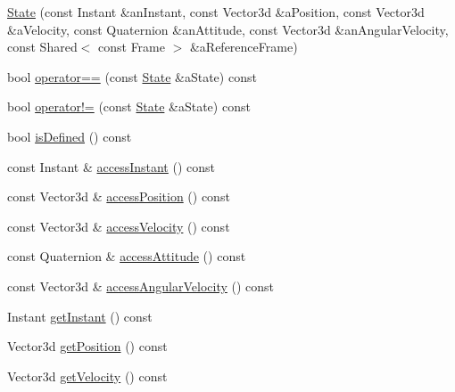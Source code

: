 \begin{DoxyCompactItemize}
\item 
\hyperlink{classlibrary_1_1astro_1_1flight_1_1profile_1_1_state_a254a001f4c2ddc33684dbfdd4ee07194}{State} (const Instant \&an\+Instant, const Vector3d \&a\+Position, const Vector3d \&a\+Velocity, const Quaternion \&an\+Attitude, const Vector3d \&an\+Angular\+Velocity, const Shared$<$ const Frame $>$ \&a\+Reference\+Frame)
\item 
bool \hyperlink{classlibrary_1_1astro_1_1flight_1_1profile_1_1_state_af9508e4482013592c37e57173baea944}{operator==} (const \hyperlink{classlibrary_1_1astro_1_1flight_1_1profile_1_1_state}{State} \&a\+State) const
\item 
bool \hyperlink{classlibrary_1_1astro_1_1flight_1_1profile_1_1_state_a086731f12479cad3f2e505572fa67883}{operator!=} (const \hyperlink{classlibrary_1_1astro_1_1flight_1_1profile_1_1_state}{State} \&a\+State) const
\item 
bool \hyperlink{classlibrary_1_1astro_1_1flight_1_1profile_1_1_state_a1fceb93d0163b18666319c16aef6dd23}{is\+Defined} () const
\item 
const Instant \& \hyperlink{classlibrary_1_1astro_1_1flight_1_1profile_1_1_state_abc3c190e5bdceda1d7c15bb685edfcc9}{access\+Instant} () const
\item 
const Vector3d \& \hyperlink{classlibrary_1_1astro_1_1flight_1_1profile_1_1_state_a96a4a1054299c79d8aafdde3313a4116}{access\+Position} () const
\item 
const Vector3d \& \hyperlink{classlibrary_1_1astro_1_1flight_1_1profile_1_1_state_a849c6426b346b48465b3e24c2248a4d8}{access\+Velocity} () const
\item 
const Quaternion \& \hyperlink{classlibrary_1_1astro_1_1flight_1_1profile_1_1_state_ac82679e41392dde2137f0e15247c3227}{access\+Attitude} () const
\item 
const Vector3d \& \hyperlink{classlibrary_1_1astro_1_1flight_1_1profile_1_1_state_ac370e25be16830246a01df5e503ddedb}{access\+Angular\+Velocity} () const
\item 
Instant \hyperlink{classlibrary_1_1astro_1_1flight_1_1profile_1_1_state_abf0cb1f8403d99cb3e091fcf77997c91}{get\+Instant} () const
\item 
Vector3d \hyperlink{classlibrary_1_1astro_1_1flight_1_1profile_1_1_state_afaa3df4fd14876d51cd840e790f26b6f}{get\+Position} () const
\item 
Vector3d \hyperlink{classlibrary_1_1astro_1_1flight_1_1profile_1_1_state_a0da3770b1a85608524d29d7f4ddec557}{get\+Velocity} () const

\end{DoxyCompactItemize}
